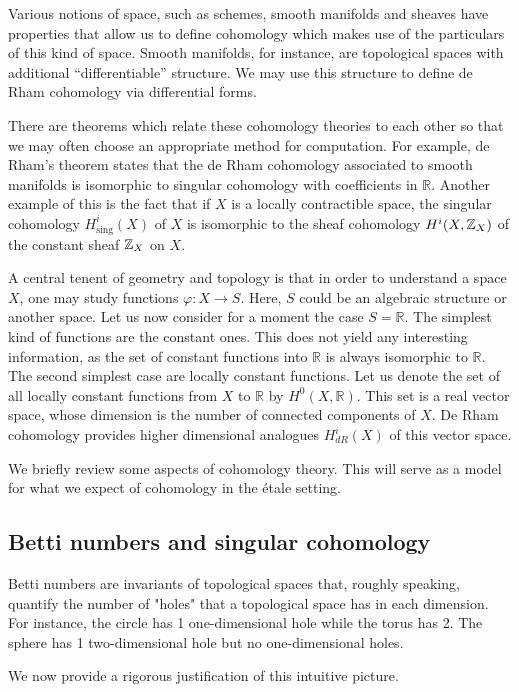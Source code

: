Various notions of space, such as schemes, smooth manifolds and sheaves have properties that allow us to define cohomology which makes use of the particulars of this kind of space. Smooth manifolds, for instance, are topological spaces with additional “differentiable” structure.  We may use this structure to define de Rham cohomology via differential forms.

There are theorems which relate these cohomology theories to each other so that we may often choose an appropriate method for computation. For example, de Rham's theorem states that the de Rham cohomology associated to smooth manifolds is isomorphic to singular cohomology with coefficients in $\mathbb{R}$. Another example of this is the fact that if $X$ is a locally contractible space, the singular cohomology $H_{\text{sing}}^i(X)$ of $X$ is isomorphic to the sheaf cohomology $H^i(X, \mathbb{Z}_X)$ of the constant sheaf $\mathbb{Z}_X$ on $X$.

A central tenent of geometry and topology is that in order to understand a space $X$, one may study functions $\varphi: X \to S$. Here, $S$ could be an algebraic structure or another space. Let us now consider for a moment the case $S=\mathbb{R}$. The simplest kind of functions are the constant ones. This does not yield any interesting information, as the set of constant functions into $\mathbb{R}$ is always isomorphic to $\mathbb{R}$. The second simplest case are locally constant functions. Let us denote the set of all locally constant functions from $X$ to $\mathbb{R}$ by $H^0(X,\mathbb{R})$. This set is a real vector space, whose dimension is the number of connected components of $X$. De Rham cohomology provides higher dimensional analogues $H^i_{dR}(X)$ of this vector space.

We briefly review some aspects of cohomology theory. This will serve as a model for what we expect of cohomology in the \'etale setting.

\subsection{Betti numbers and singular cohomology}
Betti numbers are invariants of topological spaces that, roughly speaking, quantify the number of "holes" that a topological space has in each dimension. For instance, the circle has 1 one-dimensional hole while the torus has 2. The sphere has 1 two-dimensional hole but no one-dimensional holes. 

We now provide a rigorous justification of this intuitive picture.

